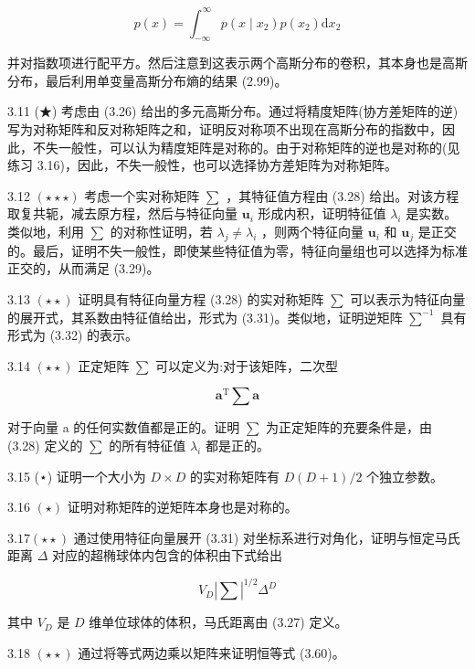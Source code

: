 \documentclass[10pt]{report}
\begin{document}
\[
p\left( x\right)  = {\int }_{-\infty }^{\infty }p\left( {x \mid  {x}_{2}}\right) p\left( {x}_{2}\right) \mathrm{d}{x}_{2} \tag{3.205}
\]

并对指数项进行配平方。然后注意到这表示两个高斯分布的卷积，其本身也是高斯分布，最后利用单变量高斯分布熵的结果 (2.99)。

3.11 (★) 考虑由 (3.26) 给出的多元高斯分布。通过将精度矩阵(协方差矩阵的逆)写为对称矩阵和反对称矩阵之和，证明反对称项不出现在高斯分布的指数中，因此，不失一般性，可以认为精度矩阵是对称的。由于对称矩阵的逆也是对称的(见练习 3.16)，因此，不失一般性，也可以选择协方差矩阵为对称矩阵。

3.12 \(\left( {\star  \star   \star  }\right)\) 考虑一个实对称矩阵 \(\mathbf{\sum }\) ，其特征值方程由 (3.28) 给出。对该方程取复共轭，减去原方程，然后与特征向量 \({\mathbf{u}}_{i}\) 形成内积，证明特征值 \({\lambda }_{i}\) 是实数。类似地，利用 \(\mathbf{\sum }\) 的对称性证明，若 \({\lambda }_{j} \neq  {\lambda }_{i}\) ，则两个特征向量 \({\mathbf{u}}_{i}\) 和 \({\mathbf{u}}_{j}\) 是正交的。最后，证明不失一般性，即使某些特征值为零，特征向量组也可以选择为标准正交的，从而满足 (3.29)。

3.13 \(\left( {\star  \star  }\right)\) 证明具有特征向量方程 (3.28) 的实对称矩阵 \(\mathbf{\sum }\) 可以表示为特征向量的展开式，其系数由特征值给出，形式为 (3.31)。类似地，证明逆矩阵 \({\mathbf{\sum }}^{-1}\) 具有形式为 (3.32) 的表示。

3.14 \(\left( {\star  \star  }\right)\) 正定矩阵 \(\sum\) 可以定义为:对于该矩阵，二次型

\[
{\mathbf{a}}^{\mathrm{T}}\mathbf{\sum }\mathbf{a} \tag{3.206}
\]

对于向量 a 的任何实数值都是正的。证明 \(\mathbf{\sum }\) 为正定矩阵的充要条件是，由 (3.28) 定义的 \(\mathbf{\sum }\) 的所有特征值 \({\lambda }_{i}\) 都是正的。

3.15 (⋆) 证明一个大小为 \(D \times  D\) 的实对称矩阵有 \(D\left( {D + 1}\right) /2\) 个独立参数。

3.16 \(\left( \star \right)\) 证明对称矩阵的逆矩阵本身也是对称的。

\({3.17}\left( {\star  \star  }\right)\) 通过使用特征向量展开 (3.31) 对坐标系进行对角化，证明与恒定马氏距离 \(\Delta\) 对应的超椭球体内包含的体积由下式给出

\[
{V}_{D}{\left| \sum \right| }^{1/2}{\Delta }^{D} \tag{3.207}
\]

其中 \({V}_{D}\) 是 \(D\) 维单位球体的体积，马氏距离由 (3.27) 定义。

3.18 \(\left( {\star  \star  }\right)\) 通过将等式两边乘以矩阵来证明恒等式 (3.60)。
\end{document}
